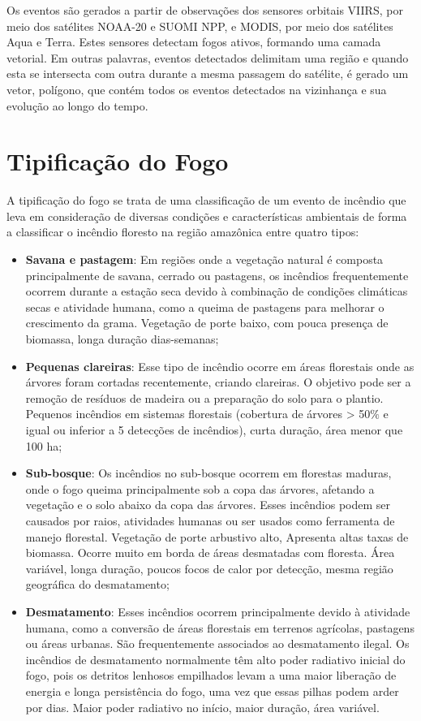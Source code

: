 Os eventos são gerados a partir de observações dos sensores orbitais VIIRS, por meio dos satélites NOAA-20 e SUOMI NPP, e MODIS, por meio dos satélites Aqua e Terra. Estes sensores detectam fogos ativos, formando uma camada vetorial. Em outras palavras, eventos detectados delimitam uma região e quando esta se intersecta com outra durante a mesma passagem do satélite, é gerado um vetor, polígono, que contém todos os eventos detectados na vizinhança e sua evolução ao longo do tempo.


\section{Tipificação do Fogo}

A tipificação do fogo se trata de uma classificação de um evento de incêndio que leva em consideração de diversas condições e características ambientais de forma a classificar o incêndio floresto na região amazônica entre quatro tipos:

\begin{itemize}
    \item \textbf{Savana e pastagem}:  Em regiões onde a vegetação natural é composta principalmente de savana, cerrado ou pastagens, os incêndios frequentemente ocorrem durante a estação seca devido à combinação de condições climáticas secas e atividade humana, como a queima de pastagens para melhorar o crescimento da grama. Vegetação de porte baixo, com pouca presença de biomassa, longa duração dias-semanas;
    \item \textbf{Pequenas clareiras}: Esse tipo de incêndio ocorre em áreas florestais onde as árvores foram cortadas recentemente, criando clareiras. O objetivo pode ser a remoção de resíduos de madeira ou a preparação do solo para o plantio. Pequenos incêndios em sistemas florestais (cobertura de árvores > 50$\%$ e igual ou inferior a 5 detecções de incêndios), curta duração, área menor que 100 ha;
    \item \textbf{Sub-bosque}: Os incêndios no sub-bosque ocorrem em florestas maduras, onde o fogo queima principalmente sob a copa das árvores, afetando a vegetação e o solo abaixo da copa das árvores. Esses incêndios podem ser causados por raios, atividades humanas ou ser usados como ferramenta de manejo florestal. Vegetação de porte arbustivo alto, Apresenta altas taxas de biomassa. Ocorre muito em borda de áreas desmatadas com floresta. Área variável, longa duração, poucos focos de calor por detecção, mesma região geográfica do desmatamento;
    \item \textbf{Desmatamento}: Esses incêndios ocorrem principalmente devido à atividade humana, como a conversão de áreas florestais em terrenos agrícolas, pastagens ou áreas urbanas. São frequentemente associados ao desmatamento ilegal. Os incêndios de desmatamento normalmente têm alto poder radiativo inicial do fogo, pois os detritos lenhosos empilhados levam a uma maior liberação de energia e longa persistência do fogo, uma vez que essas pilhas podem arder por dias. Maior poder radiativo no início, maior duração, área variável.

\end{itemize} 

